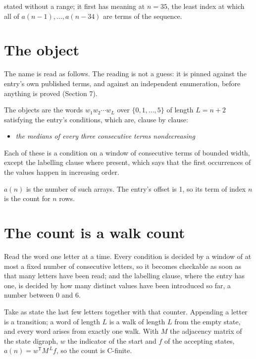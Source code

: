 \documentclass[11pt]{article}
\theoremstyle{definition}
\begin{document}
stated without a range; it first has meaning at $n = 35$, the least index at which all of $a(n-1),\dots,a(n-34)$ are terms of the sequence.

\section{The object}

The name is read as follows. The reading is not a guess: it is pinned against the entry's own published terms, and against an independent enumeration, before anything is proved (Section 7).

The objects are the words $w_1 w_2 \cdots w_L$ over $\{0,1,\dots,5\}$ of length $L = n + 2$ satisfying the entry's conditions, which are, clause by clause:

\begin{itemize}

\item {\itshape the medians of every three consecutive terms nondecreasing}

\end{itemize}

Each of these is a condition on a window of consecutive terms of bounded width, except the labelling clause where present, which says that the first occurrences of the values happen in increasing order.

$a(n)$ is the number of such arrays. The entry's offset is 1, so its term of index $n$ is the count for $n$ rows.

\section{The count is a walk count}

Read the word one letter at a time. Every condition is decided by a window of at most a fixed number of consecutive letters, so it becomes checkable as soon as that many letters have been read; and the labelling clause, where the entry has one, is decided by how many distinct values have been introduced so far, a number between $0$ and 6.

Take as state the last few letters together with that counter. Appending a letter is a transition; a word of length $L$ is a walk of length $L$ from the empty state, and every word arises from exactly one walk. With $M$ the adjacency matrix of the state digraph, $w$ the indicator of the start and $f$ of the accepting states, $a(n) = w^{\mathsf T}M^{\,L}f$, so the count is C-finite.
\end{document}
